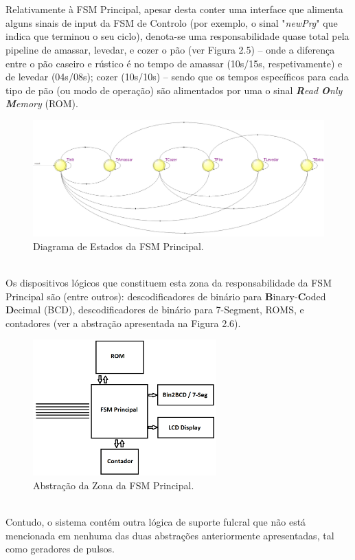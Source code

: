 \documentclass{report}
\begin{document}
\\\\
Relativamente à FSM Principal, apesar desta conter uma interface que alimenta alguns sinais de input da FSM de Controlo (por exemplo, o sinal "\textit{newPrg}" que indica que terminou o seu ciclo), denota-se uma responsabilidade quase total pela pipeline de amassar, levedar, e cozer o pão (ver Figura 2.5) -- onde a diferença entre o pão caseiro e rústico é no tempo de amassar (10s/15s, respetivamente) e de levedar (04s/08s); cozer (10s/10s) -- sendo que os tempos específicos para cada tipo de pão (ou modo de operação) são alimentados por uma o sinal \textit{\textbf{R}ead \textbf{O}nly \textbf{M}emory} (ROM).
\begin{figure}[h!] %
	\center
	\includegraphics[width=350pt]{images/FSM2_2}
	\caption{Diagrama de Estados da FSM Principal.}
	\label{fig:imagem5}
\end{figure}
\\
Os dispositivos lógicos que constituem esta zona da responsabilidade da FSM Principal são (entre outros): descodificadores de binário para \textbf{B}inary-\textbf{C}oded \textbf{D}ecimal (BCD), descodificadores de binário para 7-Segment, ROMS, e contadores (ver a abstração apresentada na Figura 2.6).
\begin{figure}[h!] %
	\center
	\includegraphics[width=200pt]{images/FSM2_Abstracao}
	\caption{Abstração da Zona da FSM Principal.}
	\label{fig:imagem6}
\end{figure}
\\
Contudo, o sistema contém outra lógica de suporte fulcral que não está mencionada em nenhuma das duas abstrações anteriormente apresentadas, tal como geradores de pulsos.
\end{document}
